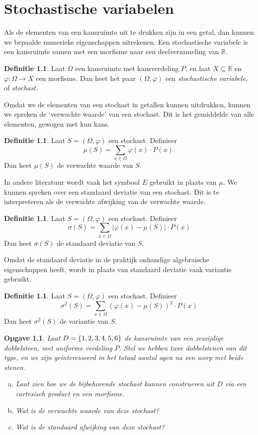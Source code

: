 \documentclass[a4paper]{book}
\newtheorem{exercise}[theorem]{Opgave}
\theoremstyle{definition}
\newtheorem{definition}[theorem]{Definitie}
\newcommand{\reals}{\mathbb{R}}
\begin{document}
\chapter{Stochastische variabelen}
Als de elementen van een kansruimte uit te drukken zijn in een getal, dan kunnen we bepaalde numerieke eigenschappen uitrekenen.
Een stochastische variabele is een kansruimte samen met een morfisme naar een deelverzameling van $\reals$.

\begin{definition}
    Laat $\Omega$ een kansruimte met kansverdeling $P$, en laat $X \subseteq \reals$ en $\varphi : \Omega \to X$ een morfisme.
    Dan heet het paar $(\Omega,\varphi)$ een \emph{stochastische variabele}, of \emph{stochast}.
\end{definition}

Omdat we de elementen van een stochast in getallen kunnen uitdrukken, kunnen we spreken de `verwachte waarde' van een stochast.
Dit is het gemiddelde van alle elementen, gewogen met kun kans.

\begin{definition}
    Laat $S = (\Omega,\varphi)$ een stochast.
    Definieer \[ \mu(S) = \sum_{x \in \Omega} \varphi(x) \cdot P(x). \]
    Dan heet $\mu(S)$ de verwachte waarde van $S$.
\end{definition}

In andere literatuur wordt vaak het symbool $E$ gebruikt in plaats van $\mu$.
We kunnen spreken over een standaard deviatie van een stochast. Dit is te interpreteren als de verwachte afwijking van de verwachte waarde.

\begin{definition}
    Laat $S = (\Omega,\varphi)$ een stochast.
    Definieer \[ \sigma(S) = \sum_{x \in \Omega} |\varphi(x) - \mu(S)| \cdot P(x) \]
    Dan heet $\sigma(S)$ de standaard deviatie van $S$.
\end{definition}

Omdat de standaard deviatie in de praktijk onhandige algebraische eigenschappen heeft, wordt in plaats van standaard deviatie vaak variantie gebruikt.

\begin{definition}
    Laat $S = (\Omega,\varphi)$ een stochast.
    Definieer \[ \sigma^2(S) = \sum_{x \in \Omega} (\varphi(x) - \mu(S))^2 \cdot P(x) \]
    Dan heet $\sigma^2(S)$ de variantie van $S$.
\end{definition}


\begin{exercise}
    Laat $D = \set{1,2,3,4,5,6}$ de kansruimte van een zeszijdige dobbelsteen, met uniforme verdeling $P$.
    Stel we hebben twee dobbelstenen van dit type, en we zijn geinteresseerd in het totaal aantal ogen na een worp met beide stenen.
    \begin{enumerate}[a.]
    \item Laat zien hoe we de bijbehorende stochast kunnen construeren uit $D$ via een cartesisch product en een morfisme.
    \item Wat is de verwachte waarde van deze stochast?
    \item Wat is de standaard afwijking van deze stochast?
    \end{enumerate}
\end{exercise}
\end{document}
